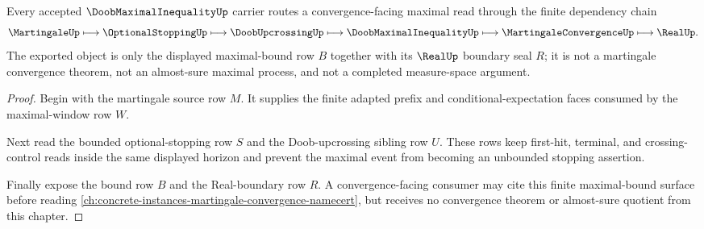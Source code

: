 \begin{theorem}
\label{thm:doob-maximal-inequality-convergence-handoff}
Every accepted $\DoobMaximalInequalityUp$ carrier routes a convergence-facing maximal read through the finite dependency chain
$$
\MartingaleUp \longmapsto \OptionalStoppingUp \longmapsto \DoobUpcrossingUp \longmapsto \DoobMaximalInequalityUp \longmapsto \MartingaleConvergenceUp \longmapsto \RealUp.
$$
The exported object is only the displayed maximal-bound row $B$ together with its $\RealUp$ boundary seal $R$; it is not a martingale convergence theorem, not an almost-sure maximal process, and not a completed measure-space argument.
\end{theorem}
\begin{proof}
Begin with the martingale source row $M$. It supplies the finite adapted prefix and conditional-expectation faces consumed by the maximal-window row $W$.

Next read the bounded optional-stopping row $S$ and the Doob-upcrossing sibling row $U$. These rows keep first-hit, terminal, and crossing-control reads inside the same displayed horizon and prevent the maximal event from becoming an unbounded stopping assertion.

Finally expose the bound row $B$ and the Real-boundary row $R$. A convergence-facing consumer may cite this finite maximal-bound surface before reading \autoref{ch:concrete-instances-martingale-convergence-namecert}, but receives no convergence theorem or almost-sure quotient from this chapter.
\end{proof}



